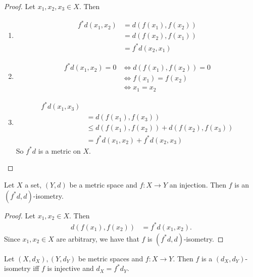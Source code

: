 \documentclass{book}
\begin{document}
\begin{proof} 
	Let $x_1,x_2,x_3 \in X$. Then
	\begin{enumerate}
		\item
		\begin{align*}
			f^*d(x_1, x_2)
			& = d(f(x_1), f(x_2)) \\
			& = d(f(x_2), f(x_1)) \\
			& = f^*d(x_2, x_1)
		\end{align*}
		\item 
		\begin{align*}
			f^*d(x_1, x_2) = 0
			& \iff  d(f(x_1), f(x_2)) = 0 \\
			& \iff f(x_1) = f(x_2) \\
			& \iff x_1 = x_2
		\end{align*}
		\item 
		\begin{align*}
			f^*d(x_1, x_3) \\
			& = d(f(x_1), f(x_3)) \\
			& \leq d(f(x_1), f(x_2)) + d(f(x_2), f(x_3)) \\
			& = f^*d(x_1, x_2) + f^*d(x_2, x_3)
		\end{align*}
		So $f^*d$ is a metric on $X$.
	\end{enumerate}
\end{proof}

\begin{ex} 
	Let $X$ a set, $(Y, d)$ be a metric space and $f:X \rightarrow Y$ an injection. Then $f$ is an $(f^*d, d)$-isometry.
\end{ex}

\begin{proof}
	Let $x_1, x_2 \in X$. Then 
	\begin{align*}
		d(f(x_1), f(x_2))
		& = f^*d(x_1, x_2).
	\end{align*}
	Since $x_1, x_2 \in X$ are arbitrary, we have that $f$ is $(f^*d, d)$-isometry. 
\end{proof}

\begin{ex} 
	Let $(X, d_X), (Y, d_Y)$ be metric spaces and $f:X \rightarrow Y$. Then $f$ is a $(d_X, d_Y)$-isometry iff $f$ is injective and $d_X = f^*d_Y$.
\end{ex}
\end{document}
